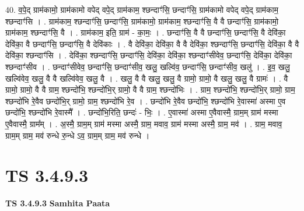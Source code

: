 \documentclass[17pt]{extarticle}
\begin{document}
40. व॒पे॒द् ग्राम॑कामो॒ ग्राम॑कामो वपेद् वपे॒द् ग्राम॑काम॒ श्छन्दाꣳ॑सि॒ छन्दाꣳ॑सि॒ ग्राम॑कामो वपेद् वपे॒द् ग्राम॑काम॒ श्छन्दाꣳ॑सि । . ग्राम॑काम॒ श्छन्दाꣳ॑सि॒ छन्दाꣳ॑सि॒ ग्राम॑कामो॒ ग्राम॑काम॒ श्छन्दाꣳ॑सि॒ वै वै छन्दाꣳ॑सि॒ ग्राम॑कामो॒ ग्राम॑काम॒ श्छन्दाꣳ॑सि॒ वै । . ग्राम॑काम॒ इति॒ ग्राम॑ - का॒मः॒ । . छन्दाꣳ॑सि॒ वै वै छन्दाꣳ॑सि॒ छन्दाꣳ॑सि॒ वै देवि॑का॒ देवि॑का॒ वै छन्दाꣳ॑सि॒ छन्दाꣳ॑सि॒ वै देवि॑काः । . वै देवि॑का॒ देवि॑का॒ वै वै देवि॑का॒ श्छन्दाꣳ॑सि॒ छन्दाꣳ॑सि॒ देवि॑का॒ वै वै देवि॑का॒ श्छन्दाꣳ॑सि । . देवि॑का॒ श्छन्दाꣳ॑सि॒ छन्दाꣳ॑सि॒ देवि॑का॒ देवि॑का॒ श्छन्दाꣳ॑सीवेव॒ छन्दाꣳ॑सि॒ देवि॑का॒ देवि॑का॒ श्छन्दाꣳ॑सीव । . छन्दाꣳ॑सीवेव॒ छन्दाꣳ॑सि॒ छन्दाꣳ॑सीव॒ खलु॒ खल्वि॑व॒ छन्दाꣳ॑सि॒ छन्दाꣳ॑सीव॒ खलु॑ । . इ॒व॒ खलु॒ खल्वि॑वेव॒ खलु॒ वै वै खल्वि॑वेव॒ खलु॒ वै । . खलु॒ वै वै खलु॒ खलु॒ वै ग्रामो॒ ग्रामो॒ वै खलु॒ खलु॒ वै ग्रामः॑ । . वै ग्रामो॒ ग्रामो॒ वै वै ग्राम॒ श्छन्दो॑भि॒ श्छन्दो॑भि॒र् ग्रामो॒ वै वै ग्राम॒ श्छन्दो॑भिः । . ग्राम॒ श्छन्दो॑भि॒ श्छन्दो॑भि॒र् ग्रामो॒ ग्राम॒ श्छन्दो॑भि रे॒वैव छन्दो॑भि॒र् ग्रामो॒ ग्राम॒ श्छन्दो॑भि रे॒व । . छन्दो॑भि रे॒वैव छन्दो॑भि॒ श्छन्दो॑भि रे॒वास्मा॑ अस्मा ए॒व छन्दो॑भि॒ श्छन्दो॑भि रे॒वास्मै᳚ । . छन्दो॑भि॒रिति॒ छन्दः॑ - भिः॒ । . ए॒वास्मा॑ अस्मा ए॒वैवास्मै॒ ग्राम॒म् ग्राम॑ मस्मा ए॒वैवास्मै॒ ग्राम᳚म् । . अ॒स्मै॒ ग्राम॒म् ग्राम॑ मस्मा अस्मै॒ ग्राम॒ मवाव॒ ग्राम॑ मस्मा अस्मै॒ ग्राम॒ मव॑ । . ग्राम॒ मवाव॒ ग्राम॒म् ग्राम॒ मव॑ रुन्धे रु॒न्धे ऽव॒ ग्राम॒म् ग्राम॒ मव॑ रुन्धे । \newline
\pagebreak
{}

\section{ TS 3.4.9.3 }

\textbf{TS 3.4.9.3 } \newline
\textbf{Samhita Paata} \newline
\end{document}
